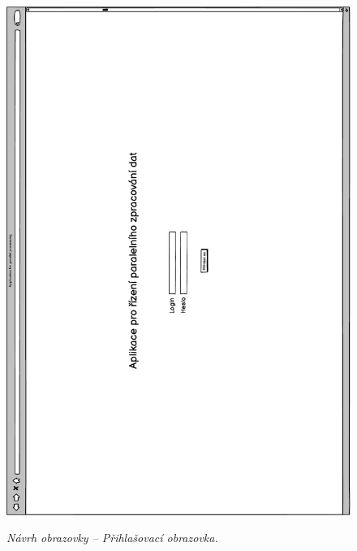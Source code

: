 \begin{figure}[H]
\begin{center}
    \scalebox{0.78}
    {   
        \includegraphics{images/wireframe_appendix_loginPage.pdf}
    }
    \caption{\label{obr:wireframe_appendix_loginPage} {\it Návrh obrazovky -- Přihlašovací obrazovka.}}
\end{center}
\end{figure}

